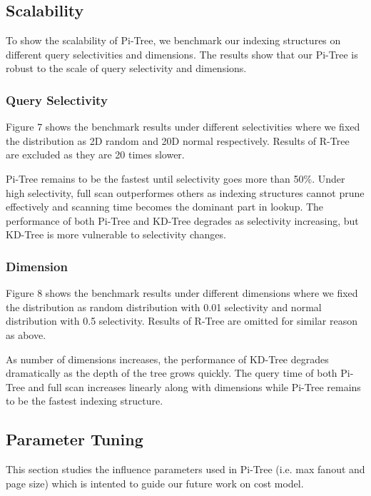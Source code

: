 \documentclass[sigconf,10pt]{acmart}
\begin{document}
\subsection{Scalability}

To show the scalability of Pi-Tree, we benchmark our indexing structures on different
query selectivities and dimensions. The results show that our Pi-Tree is robust to the
scale of query selectivity and dimensions.

\subsubsection{Query Selectivity}

Figure 7 shows the benchmark results under different selectivities where we fixed the
distribution as 2D random and 20D normal respectively. Results of R-Tree are excluded
as they are 20 times slower.

Pi-Tree remains to be the fastest until selectivity goes more than 50\%. Under high selectivity,
full scan outperformes others as indexing structures cannot prune effectively and scanning
time becomes the dominant part in lookup. The performance of both Pi-Tree and KD-Tree degrades
as selectivity increasing, but KD-Tree is more vulnerable to selectivity changes.

\subsubsection{Dimension}

Figure 8 shows the benchmark results under different dimensions where we fixed the
distribution as random distribution with 0.01 selectivity and normal distribution with
0.5 selectivity. Results of R-Tree are omitted for similar reason as above.

As number of dimensions increases, the performance of KD-Tree degrades dramatically as
the depth of the tree grows quickly. The query time of both Pi-Tree and full scan increases
linearly along with dimensions while Pi-Tree remains to be the fastest indexing structure.

\subsection{Parameter Tuning}

This section studies the influence parameters used in Pi-Tree (i.e. max fanout and page size)
which is intented to guide our future work on cost model.
\end{document}
